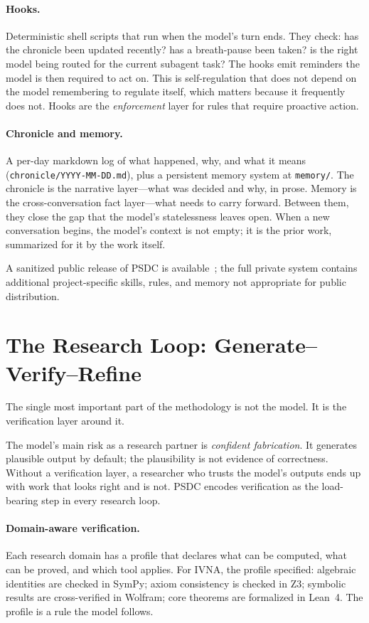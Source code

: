 \documentclass[12pt]{article}
\begin{document}
\paragraph{Hooks.} Deterministic shell scripts that run when the model's turn ends. They check: has the chronicle been updated recently? has a breath-pause been taken? is the right model being routed for the current subagent task? The hooks emit reminders the model is then required to act on. This is self-regulation that does not depend on the model remembering to regulate itself, which matters because it frequently does not. Hooks are the \emph{enforcement} layer for rules that require proactive action.

\paragraph{Chronicle and memory.} A per-day markdown log of what happened, why, and what it means (\texttt{chronicle/YYYY-MM-DD.md}), plus a persistent memory system at \texttt{memory/}. The chronicle is the narrative layer---what was decided and why, in prose. Memory is the cross-conversation fact layer---what needs to carry forward. Between them, they close the gap that the model's statelessness leaves open. When a new conversation begins, the model's context is not empty; it is the prior work, summarized for it by the work itself.

A sanitized public release of PSDC is available~\cite{psdcrepo}; the full private system contains additional project-specific skills, rules, and memory not appropriate for public distribution.

\section{The Research Loop: Generate--Verify--Refine}
\label{sec:loop}

The single most important part of the methodology is not the model. It is the verification layer around it.

The model's main risk as a research partner is \emph{confident fabrication}. It generates plausible output by default; the plausibility is not evidence of correctness. Without a verification layer, a researcher who trusts the model's outputs ends up with work that looks right and is not. PSDC encodes verification as the load-bearing step in every research loop.

\paragraph{Domain-aware verification.} Each research domain has a profile that declares what can be computed, what can be proved, and which tool applies. For IVNA, the profile specified: algebraic identities are checked in SymPy; axiom consistency is checked in Z3; symbolic results are cross-verified in Wolfram; core theorems are formalized in Lean~4. The profile is a rule the model follows.
\end{document}
